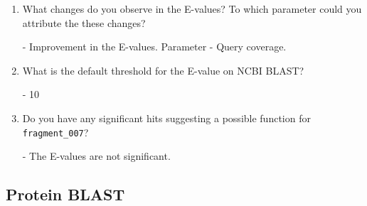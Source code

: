 \documentclass[a4paper,11pt]{article}
\begin{document}
\begin{enumerate}
\item What changes do you observe in the E-values? To which parameter could you attribute the these changes?  

- Improvement in the E-values. Parameter - Query coverage.

\item What is the default threshold for the E-value on NCBI BLAST?

- 10

\item Do you have any significant hits suggesting a possible function for \texttt{fragment\_007}? 

- The E-values are not significant. 

\end{enumerate}

\subsection{Protein BLAST}
\end{document}
